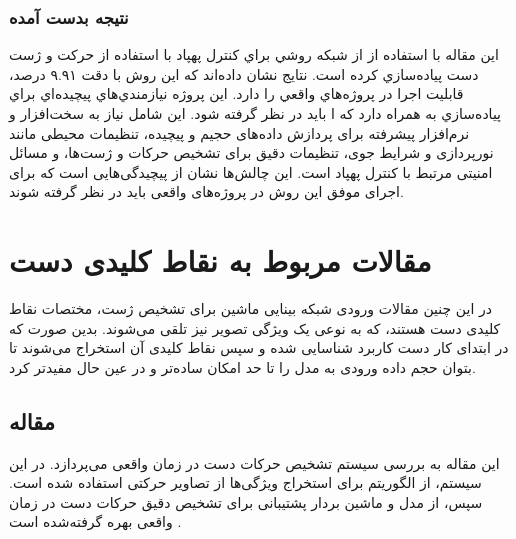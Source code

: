 \subsubsection{نتیجه بدست آمده}
اين مقاله با استفاده از از شبكه  روشي براي كنترل پهپاد با استفاده از حركت و ژست دست پياده‌سازي كرده است. نتايج نشان داده‌اند كه اين روش با دقت ۹.۹۱ درصد، قابليت اجرا در پروژه‌هاي واقعي را دارد.  این پروژه نيازمندي‌هاي پيچيده‌اي براي پياده‌سازي به همراه دارد كه ا بايد در نظر گرفته شود. این شامل نیاز به سخت‌افزار و نرم‌افزار پیشرفته برای پردازش داده‌های حجیم و پیچیده،
 تنظیمات محیطی مانند نورپردازی و شرایط جوی، تنظیمات دقیق برای تشخیص حرکات و ژست‌ها، و مسائل امنیتی مرتبط با کنترل پهپاد است. این چالش‌ها نشان از پیچیدگی‌هایی است که برای اجرای موفق این روش در پروژه‌های واقعی باید در نظر گرفته شوند.




\section{مقالات مربوط به نقاط کلیدی دست}
در این چنین مقالات ورودی شبکه بینایی ماشین برای تشخیص ژست، مختصات نقاط کلیدی دست هستند، که به نوعی یک ویژگی تصویر نیز تلقی می‌شوند. بدین صورت که در ابتدای کار دست کاربرد شناسایی شده و سپس نقاط کلیدی آن استخراج می‌شوند تا بتوان حجم داده ورودی به مدل را تا حد امکان ساده‌تر و در عین حال مفیدتر کرد.


\subsection{مقاله }
این مقاله به بررسی سیستم تشخیص حرکات دست در زمان واقعی می‌پردازد. در این سیستم، از الگوریتم  برای استخراج ویژگی‌ها از تصاویر حرکتی استفاده شده است. سپس، از مدل  و ماشین بردار پشتیبانی برای تشخیص دقیق حرکات دست در زمان واقعی بهره گرفته‌شده‌ است \cite{murugeswari2014hand}.


